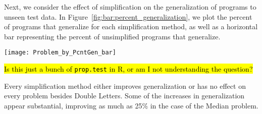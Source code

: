 
Next, we consider the effect of simplification on the generalization of programs to unseen test data. In Figure~\ref{fig:bar:percent_generalization}, we plot the percent of programs that generalize for each simplification method, as well as a horizontal bar representing the percent of unsimplified programs that generalize.

\begin{figure*}[t] %
\centering
\texttt{[image: Problem\_by\_PcntGen\_bar]} %
\caption{The proportion of simplified programs that generalize to unseen data
	for each problem, with the proportion of unchanged programs that generalize 
	indicated with black horizontal bars.
 \hl{Question: In this figure, how much of the time are the simplified programs significantly better at generalization than the unsimplified programs? How would we measure this? Do we need to?}}
 \hl{Is this just a bunch of \texttt{prop.test} in R, or am I not understanding
 	the question?}
\label{fig:bar:percent_generalization}
\end{figure*}

Every simplification method either improves generalization or has no effect on every problem besides Double Letters.
 Some of the increases in generalization appear substantial, 
improving as much as 25\% in the case of the Median problem.

